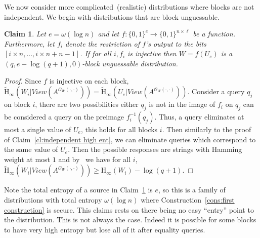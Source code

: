 \documentclass[11pt]{article}
\newcommand{\clref}[1]{\mbox{Claim~\ref{#1}}}
\newcommand{\consref}[1]{\mbox{Construction~\ref{#1}}}
\newcommand{\zo}{\ensuremath{\{0, 1\}}}
\newcommand{\Hoo}{\mathrm{H}_\infty}
\newcommand{\Hav}{\tilde{\mathrm{H}}_\infty}
\newtheorem{claim}[theorem]{Claim}
\begin{document}
We now consider more complicated~(realistic) distributions where blocks are not independent.  We begin with distributions that are block unguessable.



\begin{claim}
\label{cl:each block from single seed}
Let $e =\omega(\log n)$ and let $f:\zo^e \rightarrow \zo^{n\times \ell}$ be a function.  Furthermore, let $f_i$ denote the restriction of $f$'s output to the bits $[i\times n,..., i\times n+n-1]$.  If for all $i, f_i$ is injective then $W = f(U_e)$ is a $( q, e - \log (q+1), 0)$-block unguessable distribution.
\end{claim}
\begin{proof}
Since $f$ is injective on each block, $\Hav(W_i | View(A^{\mathcal{O}_{W}(\cdot, \cdot)})) = \Hav(U_e | View(A^{\mathcal{O}_{W}(\cdot, \cdot)}))$.  Consider a query $q_j$ on block $i$, there are two possibilities either $q_j$ is not in the image of $f_i$ on $q_j$ can be considered a query on the preimage $f_i^{-1}(q_j)$.  Thus, a query eliminates at most a single value of $U_e$, this holds for all blocks $i$.  Then similarly to the proof of \clref{cl:independent high ent}, we can eliminate queries which correspond to the same value of $U_e$.  Then the possible responses are strings with Hamming weight at most $1$ and by~\cite[Lemma 2.2]{DBLP:journals/siamcomp/DodisORS08} we have for all $i$, $\Hav(W_i | View(A^{\mathcal{O}_{W}(\cdot, \cdot)})) \geq \Hoo(W_i) -\log (q+1)$.
\end{proof}

Note the total entropy of a source in \clref{cl:each block from single seed} is $e$, so this is a family of distributions with total entropy $\omega(\log n)$ where \consref{cons:first construction} is secure.  This claims rests on there being no easy ``entry'' point to the distribution.  This is not always the case.  Indeed it is possible for some blocks to have very high entropy but lose all of it after equality queries.
\end{document}

